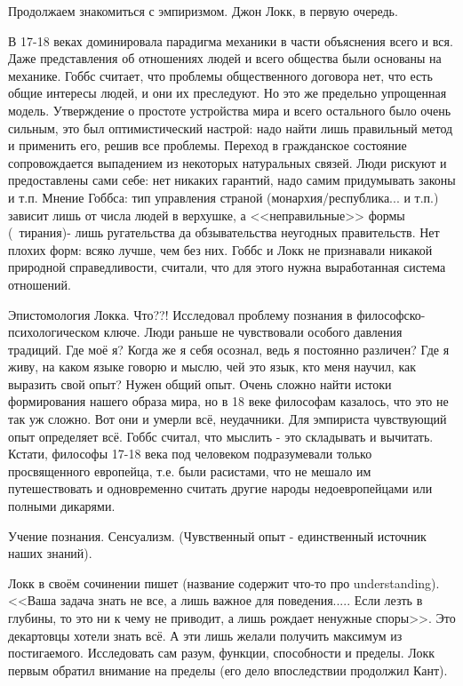 Продолжаем знакомиться с эмпиризмом.
Джон Локк, в первую очередь.

В 17-18 веках доминировала парадигма механики в части объяснения всего и вся. Даже представления об отношениях людей и всего общества были основаны на механике. Гоббс считает, что проблемы общественного договора нет, что есть общие интересы людей, и они их преследуют. Но это же предельно упрощенная модель. Утверждение о простоте устройства мира и всего остального было очень сильным, это был оптимистический настрой: надо найти лишь правильный метод и применить его, решив все проблемы.
Переход в гражданское состояние сопровождается выпадением из некоторых натуральных связей. Люди рискуют и предоставлены сами себе: нет никаких гарантий, надо самим придумывать законы и т.п.
Мнение Гоббса: тип управления страной (монархия/республика... и т.п.) зависит лишь от числа людей в верхушке, а <<неправильные>> формы (~тирания)- лишь ругательства да обзывательства неугодных правительств. Нет плохих форм: всяко лучше, чем без них.
Гоббс и Локк не признавали никакой природной справедливости, считали, что для этого нужна выработанная система отношений.

Эпистомология Локка. Что??!
Исследовал проблему познания в философско-психологическом ключе. Люди раньше не чувствовали особого давления традиций. Где моё я? Когда же я себя осознал, ведь я постоянно различен? Где я живу, на каком языке говорю и мыслю, чей это язык, кто меня научил, как выразить свой опыт? Нужен общий опыт. Очень сложно найти истоки формирования нашего образа мира, но в 18 веке философам казалось, что это не так уж сложно. Вот они и умерли всё, неудачники. Для эмпириста чувствующий опыт определяет всё. Гоббс считал, что мыслить - это складывать и вычитать. Кстати, философы 17-18 века под человеком подразумевали только просвященного европейца, т.е. были расистами, что не мешало им путешествовать и одновременно считать другие народы недоевропейцами или полными дикарями.

Учение познания. Сенсуализм. (Чувственный опыт - единственный источник наших знаний).

Локк в своём сочинении пишет (название содержит что-то про understanding). <<Ваша задача знать не все, а лишь важное для поведения..... Если лезть в глубины, то это ни к чему не приводит, а лишь рождает ненужные споры>>. Это декартовцы хотели знать всё. А эти лишь желали получить максимум из постигаемого. Исследовать сам разум, функции, способности и пределы. Локк первым обратил внимание на пределы (его дело впоследствии продолжил Кант).

